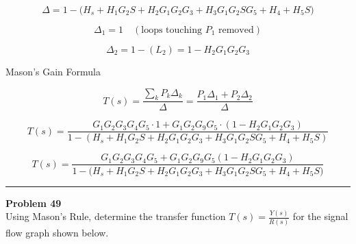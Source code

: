 \[
\Delta = 1 - \Big( H_s + H_1 G_2 S + H_2 G_1 G_2 G_3 + H_3 G_1 G_2 S G_5 + H_4 + H_5 S \Big)
\]

\[
\Delta_1 = 1 \quad (\text{loops touching } P_1 \text{ removed})
\]

\[
\Delta_2 = 1 - (L_2) = 1 - H_2 G_1 G_2 G_3
\]

Mason's Gain Formula

\[
T(s) = \frac{\sum_k P_k \Delta_k}{\Delta} = \frac{P_1 \Delta_1 + P_2 \Delta_2}{\Delta}
\]

\[
T(s) = \frac{G_1 G_2 G_3 G_4 G_5 \cdot 1 + G_1 G_2 G_9 G_5 \cdot (1 - H_2 G_1 G_2 G_3)}
{1 - (H_s + H_1 G_2 S + H_2 G_1 G_2 G_3 + H_3 G_1 G_2 S G_5 + H_4 + H_5 S)}
\]

\[
\boxed{
T(s) = \frac{G_1 G_2 G_3 G_4 G_5 + G_1 G_2 G_9 G_5 (1 - H_2 G_1 G_2 G_3)}
{1 - \big(H_s + H_1 G_2 S + H_2 G_1 G_2 G_3 + H_3 G_1 G_2 S G_5 + H_4 + H_5 S\big)}
}
\]

\newpage

\noindent\rule{\textwidth}{1pt}
\noindent\textbf{Problem 49} \hfill
\\ Using Mason's Rule, determine the transfer function \(T(s) = \frac{Y(s)}{R(s)}\) for the signal flow graph shown below.


